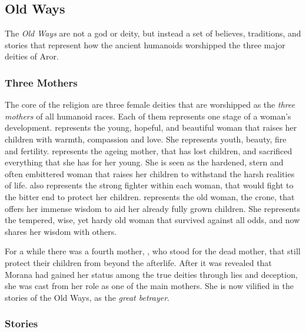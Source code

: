 \subsection{Old Ways}
\label{sec:Old Ways}

The \emph{Old Ways} are not a god or deity, but instead a set of believes,
traditions, and stories that represent how the ancient humanoids worshipped
the three major deities of Aror.

\subsubsection*{Three Mothers}

The core of the religion are three female deities that are worshipped as the
\emph{three mothers} of all humanoid races. Each of them represents one stage
of a woman's development.  represents the young, hopeful,
and beautiful woman that raises her children with warmth, compassion and
love. She represents youth, beauty, fire and fertility. 
represents the ageing mother, that has lost children, and sacrificed
everything that she has for her young. She is seen as the hardened, stern and
often embittered woman that raises her children to withstand the harsh
realities of life.  also represents the strong fighter
within each woman, that would fight to the bitter end to protect her
children.  represents the old woman, the crone, that
offers her immense wisdom to aid her already fully grown children. She
represents the tempered, wise, yet hardy old woman that survived against all
odds, and now shares her wisdom with others.

For a while there was a fourth mother, , who stood for the
dead mother, that still protect their children from beyond the afterlife.
After it was revealed that Morana had gained her status among the true deities
through lies and deception, she was cast from her role as one of the main
mothers. She is now vilified in the stories of the Old Ways, as the
\emph{great betrayer}.

\subsubsection*{Stories}



